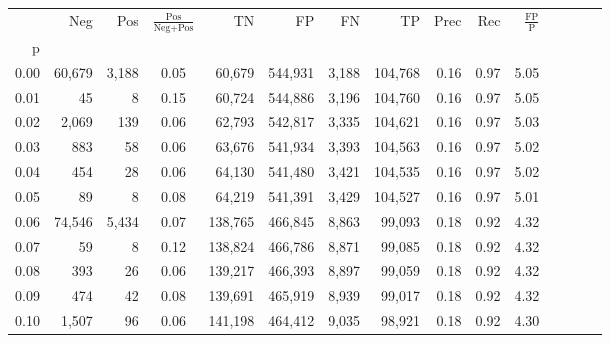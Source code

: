 \begin{tabular}{rrrcrrrrrrrrrrr}
\toprule
{} &     Neg &     Pos & $\frac{\text{Pos}}{\text{Neg}+\text{Pos}}$ &       TN &       FP &       FN &       TP &  Prec &   Rec & $\frac{\text{FP}}{\text{P}}$ \\
p    &         &         &                                            &          &          &          &          &       &       &                              \\
\midrule
0.00 &  60,679 &   3,188 &                                       0.05 &   60,679 &  544,931 &    3,188 &  104,768 &  0.16 &  0.97 &                         5.05 \\
0.01 &      45 &       8 &                                       0.15 &   60,724 &  544,886 &    3,196 &  104,760 &  0.16 &  0.97 &                         5.05 \\
0.02 &   2,069 &     139 &                                       0.06 &   62,793 &  542,817 &    3,335 &  104,621 &  0.16 &  0.97 &                         5.03 \\
0.03 &     883 &      58 &                                       0.06 &   63,676 &  541,934 &    3,393 &  104,563 &  0.16 &  0.97 &                         5.02 \\
0.04 &     454 &      28 &                                       0.06 &   64,130 &  541,480 &    3,421 &  104,535 &  0.16 &  0.97 &                         5.02 \\
0.05 &      89 &       8 &                                       0.08 &   64,219 &  541,391 &    3,429 &  104,527 &  0.16 &  0.97 &                         5.01 \\
0.06 &  74,546 &   5,434 &                                       0.07 &  138,765 &  466,845 &    8,863 &   99,093 &  0.18 &  0.92 &                         4.32 \\
0.07 &      59 &       8 &                                       0.12 &  138,824 &  466,786 &    8,871 &   99,085 &  0.18 &  0.92 &                         4.32 \\
0.08 &     393 &      26 &                                       0.06 &  139,217 &  466,393 &    8,897 &   99,059 &  0.18 &  0.92 &                         4.32 \\
0.09 &     474 &      42 &                                       0.08 &  139,691 &  465,919 &    8,939 &   99,017 &  0.18 &  0.92 &                         4.32 \\
0.10 &   1,507 &      96 &                                       0.06 &  141,198 &  464,412 &    9,035 &   98,921 &  0.18 &  0.92 &                         4.30 \\

\end{tabular}
